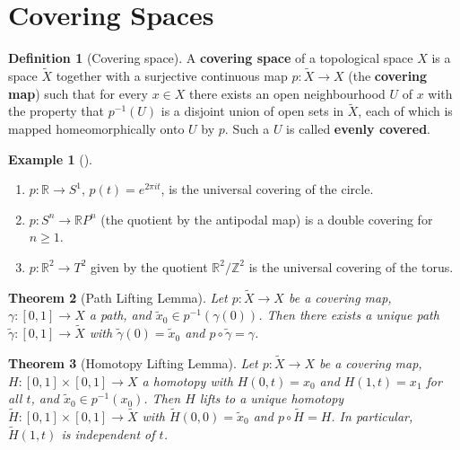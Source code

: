 \documentclass[11pt,a4paper,twoside]{book}
\newtheorem{theorem}{Theorem}[section]
\theoremstyle{remark}
\theoremstyle{definition}
\newtheorem{exampleplain}[theorem]{Example}
\theoremstyle{definition}
\newtheorem{definition}{Definition}[section]
\newenvironment{example}[1][]{%
  \begin{exampleplain}[#1]\itshape
}{%
  \end{exampleplain}
}
\begin{document}
\section{Covering Spaces}
\label{sec:covering-spaces}

\begin{definition}[Covering space]
\label{def:covering-space}
A \textbf{covering space} of a
topological space $X$ is a space $\tilde{X}$ together with a surjective
continuous map $p\colon\tilde{X}\to X$ (the \textbf{covering map}) such
that for every $x\in X$ there exists an open neighbourhood $U$ of $x$
with the property that $p^{-1}(U)$ is a disjoint union of open sets in
$\tilde{X}$, each of which is mapped homeomorphically onto $U$ by $p$.
Such a $U$ is called \textbf{evenly covered}.
\end{definition}

\begin{example}
\label{ex:covering-spaces}
\begin{enumerate}
  \item $p\colon\mathbb{R}\to S^1$, $p(t)=e^{2\pi it}$, is the
        universal covering of the circle.
  \item $p\colon S^n\to\mathbb{R}P^n$ (the quotient by the antipodal
        map) is a double covering for $n\ge 1$.
  \item $p\colon\mathbb{R}^2\to T^2$ given by the quotient
        $\mathbb{R}^2/\mathbb{Z}^2$ is the universal covering of the
        torus.
\end{enumerate}
\end{example}

\begin{theorem}[Path Lifting Lemma]
\label{thm:path-lifting}
Let $p\colon\tilde{X}\to X$ be a covering map, $\gamma\colon[0,1]\to X$
a path, and $\tilde{x}_0\in p^{-1}(\gamma(0))$.  Then there exists a
unique path $\tilde{\gamma}\colon[0,1]\to\tilde{X}$ with
$\tilde{\gamma}(0)=\tilde{x}_0$ and $p\circ\tilde{\gamma}=\gamma$.
\end{theorem}

\begin{theorem}[Homotopy Lifting Lemma]
\label{thm:homotopy-lifting}
Let $p\colon\tilde{X}\to X$ be a covering map,
$H\colon[0,1]\times[0,1]\to X$ a homotopy with $H(0,t)=x_0$ and
$H(1,t)=x_1$ for all $t$, and $\tilde{x}_0\in p^{-1}(x_0)$.  Then
$H$ lifts to a unique homotopy
$\tilde{H}\colon[0,1]\times[0,1]\to\tilde{X}$ with
$\tilde{H}(0,0)=\tilde{x}_0$ and $p\circ\tilde{H}=H$.  In particular,
$\tilde{H}(1,t)$ is independent of $t$.
\end{theorem}
\end{document}
